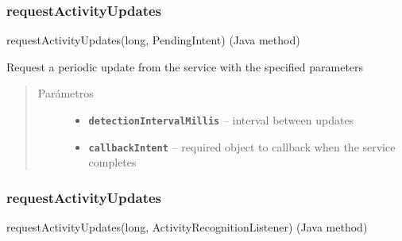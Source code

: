 \subsubsection{requestActivityUpdates}
\label{org/hardroid/api/ActivityRecognitionApi:requestactivityupdates}requestActivityUpdates(long, PendingIntent) (Java method)

\begin{fulllineitems}
\label{org/hardroid/api/ActivityRecognitionApi:org.hardroid.api.ActivityRecognitionApi.requestActivityUpdates(long, PendingIntent)}\par
Request a periodic update from the service with the specified parameters
\begin{quote}\begin{description}
\item[{Parámetros}] \leavevmode\begin{itemize}
\item {} 
\textbf{\texttt{detectionIntervalMillis}} -- interval between updates

\item {} 
\textbf{\texttt{callbackIntent}} -- required object to callback when the service completes

\end{itemize}

\end{description}\end{quote}

\end{fulllineitems}



\subsubsection{requestActivityUpdates}
\label{org/hardroid/api/ActivityRecognitionApi:id2}requestActivityUpdates(long, ActivityRecognitionListener) (Java method)

